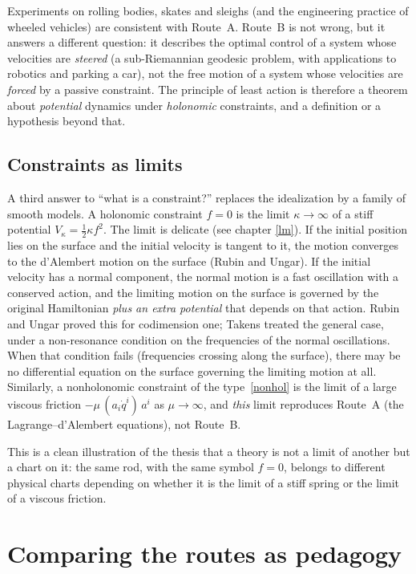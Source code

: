 Experiments on rolling bodies, skates and sleighs (and the engineering
practice of wheeled vehicles) are consistent with Route~A. Route~B is not
wrong, but it answers a different question: it describes the optimal control
of a system whose velocities are \emph{steered} (a sub-Riemannian
geodesic problem, with applications to robotics and parking a car), not the
free motion of a system whose velocities are \emph{forced} by a passive
constraint. The principle of least action is therefore a theorem about
\emph{potential} dynamics under \emph{holonomic} constraints, and a
definition or a hypothesis beyond that.

\subsection{Constraints as limits}
\label{constraints-limits}

A third answer to ``what is a constraint?'' replaces the idealization by a
family of smooth models. A holonomic constraint $f=0$ is the limit
$\kappa\to\infty$ of a stiff potential $V_\kappa=\tfrac12\kappa f^2$. The limit
is delicate (see chapter \ref{lm}). If the initial position lies on the surface
and the initial
velocity is tangent to it, the motion converges to the d'Alembert motion on the
surface (Rubin and Ungar). If the initial velocity has a normal component, the
normal motion is a fast oscillation with a conserved action, and the limiting
motion on the surface is governed by the original Hamiltonian \emph{plus an
extra potential} that depends on that action. Rubin and Ungar 
\cite{RubinUngar1957}proved this for
codimension one; Takens \cite{Takens1980} treated the general case, 
under a non-resonance
condition on the frequencies of the normal oscillations. When that condition
fails (frequencies crossing along the surface), there may be no differential
equation on the surface governing the limiting motion at all.
Similarly, a nonholonomic constraint of the type~\eqref{nonhol} is
the limit of a large viscous friction $-\mu\,(a_i\dot q^i)\,a^i$ as
$\mu\to\infty$, and \emph{this} limit reproduces Route~A (the
Lagrange--d'Alembert equations), not Route~B.

This is a clean illustration of the thesis that a theory is not a limit of
another but a chart on it: the same rod, with the same symbol $f=0$, belongs
to different physical charts depending on whether it is the limit of a stiff
spring or the limit of a viscous friction.

\section{Comparing the routes as pedagogy}
\label{pedagogy}

